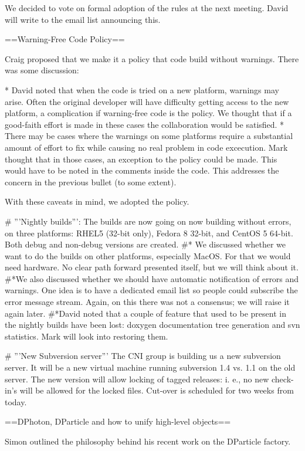 \documentclass[xcolor=dvipsnames]{beamer}
\begin{document}
{We decided to vote on formal adoption of the rules at the next meeting. David will write to the email list announcing this.

==Warning-Free Code Policy==

Craig proposed that we make it a policy that code build without warnings. There was some discussion:

* David noted that when the code is tried on a new platform, warnings may arise. Often the original developer will have difficulty getting access to the new platform, a complication if warning-free code is the policy. We thought that if a good-faith effort is made in these cases the collaboration would be satisfied.
* There may be cases where the warnings on some platforms require a substantial amount of effort to fix while causing no real problem in code excecution. Mark thought that in those cases, an exception to the policy could be made. This would have to be noted in the comments inside the code. This addresses the concern in the previous bullet (to some extent).

With these caveats in mind, we adopted the policy.

# '''Nightly builds''': The builds are now going on now building without errors, on three platforms: RHEL5 (32-bit only), Fedora 8 32-bit, and CentOS 5 64-bit. Both debug and non-debug versions are created.
#* We discussed whether we want to do the builds on other platforms, especially MacOS. For that we would need hardware. No clear path forward presented itself, but we will think about it.
#*We also discussed whether we should have automatic notification of errors and warnings. One idea is to have a dedicated email list so people could subscribe the error message stream. Again, on this there was not a consensus; we will raise it again later.
#*David noted that a couple of feature that used to be present in the nightly builds have been lost: doxygen documentation tree generation and svn statistics. Mark will look into restoring them.

# '''New Subversion server''' The CNI group is building us a new subversion server. It will be a new virtual machine running subversion 1.4 vs. 1.1 on the old server. The new version will allow locking of tagged releases: i. e., no new check-in's will be allowed for the locked files. Cut-over is scheduled for two weeks from today.

==DPhoton, DParticle and how to unify high-level objects==

Simon outlined the philosophy behind his recent work on the DParticle factory.

}
\end{document}

